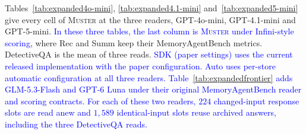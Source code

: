 \documentclass{article}
\newcommand{\nativechange}[1]{\textcolor{blue}{#1}}
\newcommand{\sys}{\textsc{Muster}}
\begin{document}
Tables~\ref{tab:expanded4o-mini}, \ref{tab:expanded4.1-mini} and~\ref{tab:expanded5-mini} give every cell of \sys{} at the three readers, GPT-4o-mini, GPT-4.1-mini and GPT-5-mini. \nativechange{In these three tables, the last column is \sys{} under Infini-style scoring}, where Rec and Summ keep their MemoryAgentBench metrics. DetectiveQA is the mean of three reads. \nativechange{SDK (paper settings) uses the current released implementation with the paper configuration. Auto uses per-store automatic configuration at all three readers. Table~\ref{tab:expandedfrontier} adds GLM-5.3-Flash and GPT-6 Luna under their original MemoryAgentBench reader and scoring contracts. For each of these two readers, $224$ changed-input response slots are read anew and $1{,}589$ identical-input slots reuse archived answers, including the three DetectiveQA reads.}
\end{document}
